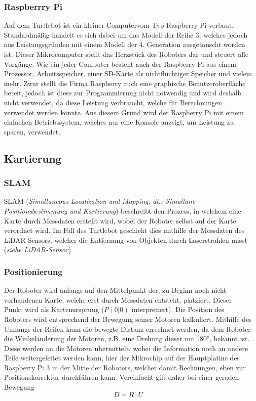 {{		\subsubsection{Raspberrry Pi}
		{
			Auf dem Turtlebot ist ein kleiner Computervom Typ Raspberry Pi verbaut. Standardmäßig handelt es sich dabei um das Modell der Reihe 3, welches jedoch aus Leistungsgründen mit einem Modell der 4. Generation ausgetauscht worden ist. Dieser Mikrocomputer stellt das Herzstück des Roboters dar und steuert alle Vorgänge. Wie ein jeder Computer besteht auch der Raspberry Pi aus einem Prozessor, Arbeitsspeicher, einer SD-Karte als nichtflüchtiger Speicher und vielem mehr. Zwar stellt die Firma Raspberry auch eine graphische Benutzeroberfläche bereit, jedoch ist diese zur Programmierung nicht notwendig und wird deshalb nicht verwendet, da diese Leistung verbraucht, welche für Berechnungen verwendet werden könnte. Aus diesem Grund wird der Raspberry Pi mit einem einfachen Betriebssystem, welches nur eine Konsole anzeigt, um Leistung zu sparen, verwendet. \parencite{raspberrypi}
		}
	}
	\subsection{Kartierung}
	{
		\subsubsection{SLAM}
		{
			SLAM (\emph{Simultaneous Localization and Mapping, dt.: Simultane Positionsbestimmung und Kartierung}) beschreibt den Prozess, in welchem eine Karte durch Messdaten erstellt wird, wobei der Roboter selbst auf der Karte verordnet wird.
			Im Fall des Turtlebot geschieht dies mithilfe der Messdaten des LiDAR-Sensors, welcher die Entfernung von Objekten durch Laserstrahlen misst (\emph{siehe LiDAR-Sensor})	
		}
		
		\subsubsection{Positionierung}
		{
			Der Roboter wird anfangs auf den Mittelpunkt der, zu Beginn noch nicht vorhandenen Karte, welche erst durch Messdaten entsteht, platziert. Dieser Punkt wird als Kartenursprung ($P(0|0)$ interpretiert). Die Position des Roboters wird entsprechend der Bewegung seiner Motoren kalkuliert. Mithilfe des Umfangs der Reifen kann die bewegte Distanz errechnet werden, da dem Roboter die Winkeländerung der Motoren, z.B. eine Drehung dieser um 180°, bekannt ist. Diese werden an die Motoren übermittelt, wobei die Information noch an andere Teile weitergeleitet werden kann, hier der Mikrochip auf der Hauptplatine des Raspberry Pi 3 in der Mitte der Roboters, welcher damit Rechnungen, eben zur Positionskorrektur durchführen kann. Vereinfacht gilt daher bei einer geraden Bewegung \parencite{slam}
			\begin{equation}
				D = R \cdot U
			\end{equation} 
			
}}}
